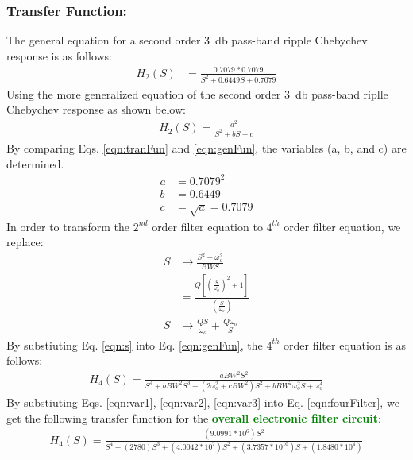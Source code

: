 \documentclass[hidelinks]{article}
\begin{document}
	\subsubsection*{Transfer Function:}
	The general equation for a second order \SI{3}{\decibel} pass-band ripple Chebychev response is as follows:
	\begin{align}
	\label{eqn:tranFun}
		H_2 (S) &= \frac{0.7079 * 0.7079}{S^{2} + 0.6449 S + 0.7079}
	\end{align}
	Using the more generalized equation of the second order \SI{3}{\decibel} pass-band riplle Chebychev response as shown below:
	\begin{align}
		\label{eqn:genFun}
		H_2 (S) = \frac{a^{2}}{S^{2} + b S + c}
	\end{align}
	By comparing Eqs. \ref{eqn:tranFun} and \ref{eqn:genFun}, the variables (a, b, and c) are determined.
	\begin{align}
		\label{eqn:var1}
		a &= 0.7079^2\\
		\label{eqn:var2}
		b &= 0.6449\\
		\label{eqn:var3}
		c &= \sqrt{a} = 0.7079
	\end{align}
	In order to transform the $2^{nd}$ order filter equation to $4^{th}$ order filter equation, we replace:
	\begin{align}
		S &\rightarrow \frac{S^{2} + \omega_o^{2}}{BW S}\\ 
		&= \frac{Q\left[\left(\frac{S}{\omega_o}\right)^{2} + 1\right]}{\left(\frac{S}{\omega_o}\right)}\nonumber\\	
		S &\rightarrow \frac{QS}{\omega_o} + \frac{Q\omega_o}{S} \label{eqn:s}
	\end{align}
	By substiuting Eq. \ref{eqn:s} into Eq. \ref{eqn:genFun}, the $4^{th}$ order filter equation is as follows:
	\begin{align}
	\label{eqn:fourFilter}
		H_4 (S) = \frac{a BW^{2} S^{2}}{S^{4} + b BW^{2} S^{3} + (2\omega_o^{2} + c BW^{2}) S^{2} + b BW^{2} \omega_o^{2} S + \omega_o^{4}}
	\end{align}
	By substiuting Eqs. \ref{eqn:var1}, \ref{eqn:var2}, \ref{eqn:var3} into Eq. \ref{eqn:fourFilter}, we get the following transfer function for the \textbf{\textcolor{green}{overall electronic filter circuit}}:
	\begin{align}
		\label{eqn:fourFilterNum}
		H_4 (S) = \frac{(9.0991 * 10^{6}) S^{2}}{S^{4} + (2780) S^{3} + (4.0042 * 10^{7}) S^{2} + (3.7357 * 10^{10}) S + (1.8480 * 10^{4})}
	\end{align}
\end{document}
